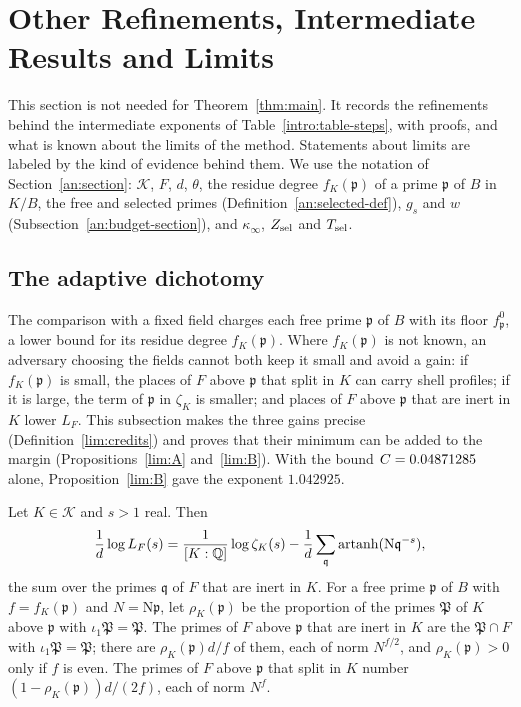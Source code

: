 \section{Other Refinements, Intermediate Results and Limits}\label{lim:section}

This section is not needed for Theorem~\ref{thm:main}. It records the
refinements behind the intermediate exponents of
Table~\ref{intro:table-steps}, with proofs, and what is known about the limits
of the method. Statements about limits are labeled by the kind of evidence
behind them. We use the notation of Section~\ref{an:section}: $\mathcal K$,
$F$, $d$, $\theta$, the residue degree $f_K(\mathfrak p)$ of a prime
$\mathfrak p$ of $B$ in $K/B$, the free and selected primes
(Definition~\ref{an:selected-def}), $g_s$ and $w$
(Subsection~\ref{an:budget-section}), and $\kappa_\infty$, $Z_{\rm sel}$ and
$T_{\rm sel}$.

\subsection{The adaptive dichotomy}
The comparison with a fixed field charges each free prime $\mathfrak p$ of $B$
with its floor $f^0_{\mathfrak p}$, a lower bound for its residue degree
$f_K(\mathfrak p)$. Where $f_K(\mathfrak p)$ is not known, an adversary
choosing the fields cannot both keep it small and avoid a gain: if
$f_K(\mathfrak p)$ is small, the places of $F$ above $\mathfrak p$ that split
in $K$ can carry shell profiles; if it is large, the term of $\mathfrak p$ in
$\zeta_K$ is smaller; and places of $F$ above $\mathfrak p$ that are inert in
$K$ lower $L_F$. This subsection makes the three gains precise
(Definition~\ref{lim:credits}) and proves that their minimum can be added to
the margin (Propositions~\ref{lim:A} and~\ref{lim:B}). With the bound
$C=0.04871285$ alone, Proposition~\ref{lim:B} gave the exponent $1.042925$.

\begin{lemma}\label{lim:inert}
Let $K\in\mathcal K$ and $s>1$ real. Then
\[
 \frac1d\log L_F(s)=\frac1{[K:\mathbb Q]}\log\zeta_K(s)-\frac1d\sum_{\mathfrak q}
 \operatorname{artanh}(\mathrm N\mathfrak q^{-s}),
\]
the sum over the primes $\mathfrak q$ of $F$ that are inert in $K$. For a free
prime $\mathfrak p$ of $B$ with $f=f_K(\mathfrak p)$ and $N=\mathrm N\mathfrak
p$, let $\rho_K(\mathfrak p)$ be the proportion of the primes $\mathfrak P$ of
$K$ above $\mathfrak p$ with $\iota_1\mathfrak P=\mathfrak P$. The primes of
$F$ above $\mathfrak p$ that are inert in $K$ are the $\mathfrak P\cap F$ with
$\iota_1\mathfrak P=\mathfrak P$; there are $\rho_K(\mathfrak p)d/f$ of them,
each of norm $N^{f/2}$, and $\rho_K(\mathfrak p)>0$ only if $f$ is even. The
primes of $F$ above $\mathfrak p$ that split in $K$ number
$(1-\rho_K(\mathfrak p))d/(2f)$, each of norm $N^f$.
\end{lemma}

